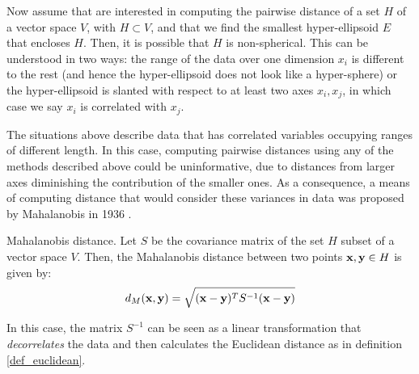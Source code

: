 \documentclass[../main.tex]{subfiles} \label{chapter_soa}
\begin{document}
\par Now assume that are interested in computing the pairwise distance of a set $H$ of a vector space $V$, with $H \subset V$, and that we find the smallest hyper-ellipsoid $E$ that encloses $H$. Then, it is possible that $H$ is non-spherical. This can be understood in two ways: the range of the data over one dimension $x_i$ is different to the rest (and hence the hyper-ellipsoid does not look like a hyper-sphere) or the hyper-ellipsoid is slanted with respect to at least two axes $x_i, x_j$, in which case we say $x_i$ is correlated with $x_j$.
\par The situations above describe data that has correlated variables occupying ranges of different length. In this case, computing pairwise distances using any of the methods described above could be uninformative, due to distances from larger axes diminishing the contribution of the smaller ones. As a consequence, a means of computing distance that would consider these variances in data was proposed by Mahalanobis in 1936 \cite{Bellet2013}.

\begin{definition}{Mahalanobis distance.} \label{def_mahalanobis}
Let $S$ be the covariance matrix of the set $H$ subset of a vector space $V$. Then, the Mahalanobis distance between two points $\mathbf{x,y}\in H$ is given by:
\begin{align*}
d_{M}(\mathbf{x}, \mathbf{y}) = \sqrt{(\mathbf{x}-\mathbf{y})^TS^{-1}(\mathbf{x}-\mathbf{y})}
\end{align*}
\end{definition}

\par In this case, the matrix $S^{-1}$ can be seen as a linear transformation that \emph{decorrelates} the data and then calculates the Euclidean distance as in definition \ref{def_euclidean}. 
\end{document}
